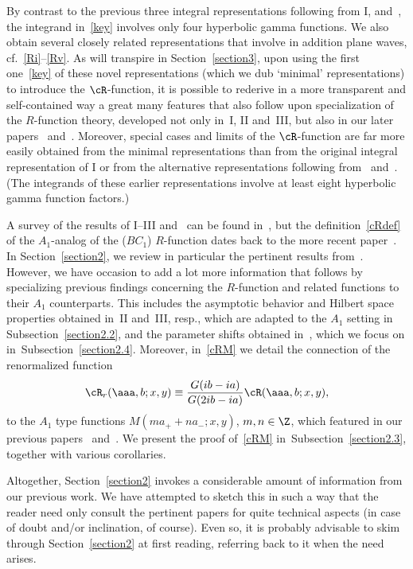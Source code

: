 By contrast to the previous three integral representations following from I, \cite{bult} and~\cite{bust}, the integrand in~\eqref{key}
involves only four hyperbolic gamma functions. We also obtain several closely related representations that involve in addition plane waves, cf.~\eqref{Ri}--\eqref{Rv}. As will transpire in Section~\ref{section3}, upon using the f\/irst one~\eqref{key} of these novel representations (which we dub `minimal' representations) to introduce the $\cR$-function, it is possible to rederive in a more transparent and self-contained way a great many features that also follow upon specialization of the $R$-function theory, developed not only in~I, II and~III, but also in our later papers~\cite{anne} and~\cite{quad}. Moreover, special cases and limits of the $\cR$-function are far more easily obtained from the minimal representations than from the original integral representation of I or from the alternative representations following from~\cite{bult} and~\cite{bust}. (The integrands of these earlier representations involve at least eight hyperbolic gamma function factors.)

A survey of the results of I--III and~\cite{anne} can be found in~\cite{Rsurv}, but the def\/inition~\eqref{cRdef} of the $A_1$-analog of the ($BC_1$) $R$-function dates back to the more recent paper~\cite{quad}. In Section~\ref{section2}, we review in particular the pertinent results from~\cite{quad}. However, we have occasion to  add a lot more information that follows by specializing previous f\/indings concerning the $R$-function and related functions to their $A_1$ counterparts. This includes the asymptotic behavior and Hilbert space properties obtained in~II and~III, resp., which are adapted to the $A_1$ setting in Subsection~\ref{section2.2}, and the parameter shifts obtained in~\cite{anne}, which we focus on in~Subsection~\ref{section2.4}.  Moreover, in~\eqref{cRM} we detail the connection of the renormalized function
\begin{gather}\label{cRr}
\cR_r(\aaa,b;x,y)\equiv  \frac{G(ib-ia)}{G(2ib-ia)}\cR(\aaa,b;x,y),
\end{gather}
to the $A_1$ type functions $M(ma_{+}+na_{-};x,y)$, $m,n\in\Z$, which featured in our previous papers~\cite{GLFII} and~\cite{Hilb}. We present the proof of~\eqref{cRM} in~Subsection~\ref{section2.3}, together with various corollaries.

Altogether, Section~\ref{section2} invokes a considerable amount of information from our previous work. We have attempted to sketch this in such a way that the reader need only consult the pertinent papers for quite technical aspects (in case of doubt and/or inclination, of course). Even so, it is probably advisable to skim through Section~\ref{section2} at f\/irst reading, referring back to it when the need arises.


